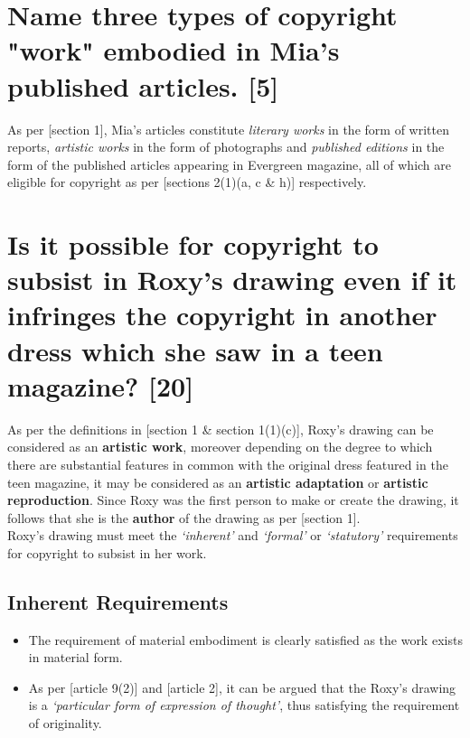 \documentclass[11pt]{article}
\begin{document}
\section{Name three types of copyright "work" embodied in Mia's published articles. [5]}
\label{sec:org2583069}

As per [section 1]\cite{rsa78_copyrightact}, Mia's articles constitute \emph{literary
works} in the form of written reports, \emph{artistic works} in the form of photographs
and \emph{published editions} in the form of the published articles appearing in
Evergreen magazine, all of which are eligible for copyright as per [sections
2(1)(a, c \& h)]\cite{rsa78_copyrightact} respectively.

\section{Is it possible for copyright to subsist in Roxy's drawing even if it infringes the copyright in another dress which she saw in a teen magazine? [20]}
\label{sec:org4614c0f}
As per the definitions in [section 1 \& section 1(1)(c)]\cite{rsa78_copyrightact},
Roxy's drawing can be considered as an \textbf{artistic work}, moreover depending on
the degree to which there are substantial features in common with the original
dress featured in the teen magazine, it may be considered as an \textbf{artistic
adaptation} or \textbf{artistic reproduction}. Since Roxy was the first person to make or
create the drawing, it follows that she is the \textbf{author} of the drawing as per [section 1]\cite{rsa78_copyrightact}.\\

Roxy's drawing must meet the \emph{`inherent'} and \emph{`formal'} or
\emph{`statutory'} requirements for copyright to subsist in her work.
\subsection{Inherent Requirements}
\label{sec:org5909392}
\begin{itemize}
\item The requirement of material embodiment is clearly satisfied as the
work exists in material form.
\item As per [article 9(2)]\cite{wto17_trips} and
[article 2]\cite{wipo96_copyright_treaty}, it can be argued that the
Roxy's drawing is a \emph{`particular form of expression of
thought'}, thus satisfying the requirement of originality.
\end{itemize}
\end{document}
